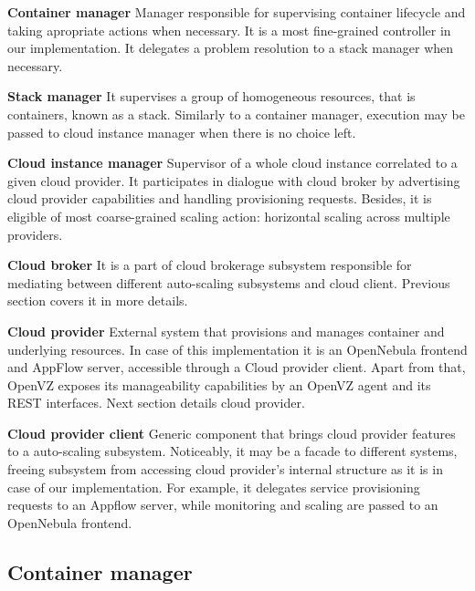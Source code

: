 \begin{asparaenum}
 \item[\textbf{Container manager}] Manager responsible for supervising container lifecycle and taking apropriate actions when necessary. It is a most fine-grained controller in our implementation. It delegates a problem resolution to a stack manager when necessary.
 
 \item[\textbf{Stack manager}] It supervises a group of homogeneous resources, that is containers, known as a stack. Similarly to a container manager, execution may be passed to cloud instance manager when there is no choice left.
 
 \item[\textbf{Cloud instance manager}] Supervisor of a whole cloud instance correlated to a given cloud provider. It participates in dialogue with cloud broker by advertising cloud provider capabilities and handling provisioning requests. Besides, it is eligible of most coarse-grained scaling action: horizontal scaling across multiple providers.
 
 \item[\textbf{Cloud broker}] It is a part of cloud brokerage subsystem responsible for mediating between different auto-scaling subsystems and cloud client. Previous section covers it in more details.
 
 \item[\textbf{Cloud provider}] External system that provisions and manages container and underlying resources. In case of this implementation it is an OpenNebula frontend and AppFlow server, accessible through a Cloud provider client. Apart from that, OpenVZ exposes its manageability capabilities by an OpenVZ agent and its REST interfaces. Next section details cloud provider.
 
 \item[\textbf{Cloud provider client}] Generic component that brings cloud provider features to a auto-scaling subsystem. Noticeably, it may be a facade to different systems, freeing subsystem from accessing cloud provider's internal structure as it is in case of our implementation. For example, it delegates service provisioning requests to an Appflow server, while monitoring and scaling are passed to an OpenNebula frontend.
\end{asparaenum}

\subsection{Container manager}

